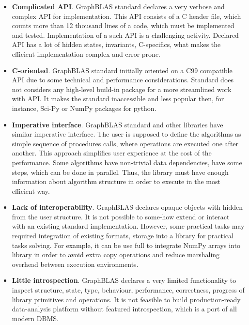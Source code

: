 \begin{itemize}
 
\item \textbf{Complicated API}. GraphBLAS standard declares a very verbose and complex API for implementation. This API consists of a C header file, which counts more than 12 thousand lines of a code, which must be implemented and tested. Implementation of a such API is a challenging activity. Declared API has a lot of hidden states, invariants, C-specifics, what makes the efficient implementation complex and error prone.

\item \textbf{C-oriented}. GraphBLAS standard initially oriented on a C99 compatible API due to some technical and performance considerations. Standard does not considers any high-level build-in package for a more streamlined work with API. It makes the standard inaccessible and less popular then, for instance, Sci-Py or NumPy packages for python.

\item \textbf{Imperative interface}. GraphBLAS standard and other libraries have similar imperative interface. The user is supposed to define the algorithms as simple sequence of procedures calls, where operations are executed one after another. This approach simplifies user experience at the cost of the performance. Some algorithms have non-trivial data dependencies, have some steps, which can be done in parallel. Thus, the library must have enough information about algorithm structure in order to execute in the most efficient way.

\item \textbf{Lack of interoperability}. GraphBLAS declares opaque objects with hidden from the user structure. It is not possible to some-how extend or interact with an existing standard implementation. However, some practical tasks may required integration of existing formats, storage into a library for practical tasks solving. For example, it can be use full to integrate NumPy arrays into library in order to avoid extra copy operations and reduce marshaling overhead between execution environments.

\item \textbf{Little introspection}. GraphBLAS declares a very limited functionality to inspect structure, state, type, behaviour, performance, correctness, progress of library primitives and operations. It is not feasible to build production-ready data-analysis platform without featured introspection, which is a port of all modern DBMS.


\end{itemize}
